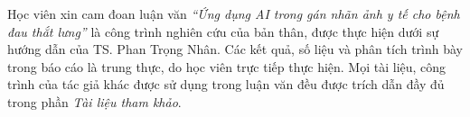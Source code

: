 \documentclass[12pt]{report}
\begin{document}

\author{Hà Trung Kiên - 2470723}
\beforepreface
{}





    
Học viên xin cam đoan luận văn \textit{``Ứng dụng AI trong gán nhãn ảnh y tế cho bệnh đau thắt lưng''} là công trình nghiên cứu của bản thân, được thực hiện dưới sự hướng dẫn của TS. Phan Trọng Nhân. Các kết quả, số liệu và phân tích trình bày trong báo cáo là trung thực, do học viên trực tiếp thực hiện. Mọi tài liệu, công trình của tác giả khác được sử dụng trong luận văn đều được trích dẫn đầy đủ trong phần \textit{Tài liệu tham khảo}.
\end{document}
